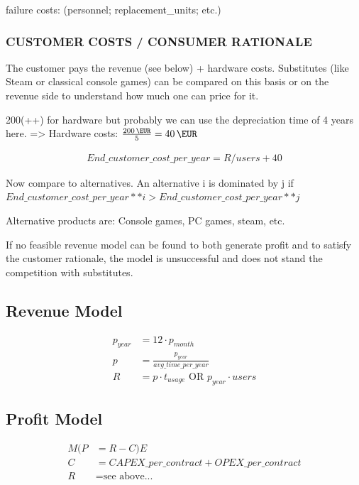 failure costs: (personnel; replacement\_units; etc.) 

\subsubsection{CUSTOMER COSTS / CONSUMER RATIONALE}

The customer pays the revenue (see below) + hardware costs. Substitutes (like Steam or classical console games) can be compared on this basis or on the revenue side to understand how much one can price for it.

200(++) for hardware but probably we can use the depreciation time of 4 years here. 
=> Hardware costs: $ \frac{\SI{200}{\EUR}}{5}  = \SI{40}{\EUR}$

\begin{align}
End\_customer\_cost\_per\_year = R/users + 40
\end{align}

Now compare to alternatives. An alternative i is dominated by j if $End\_customer\_cost\_per\_year ** i > End\_customer\_cost\_per\_year ** j$

Alternative products are: Console games, PC games, steam, etc.

If no feasible revenue model can be found to both generate profit and to satisfy the customer rationale, the model is unsuccessful and does not stand the competition with substitutes.



\subsection{Revenue Model}

\begin{align*}
p_{year} &= 12 \cdot p_{month} \\
p &= \frac{p_{year}}{avg\_time\_per\_year} \\
R &= p  \cdot t_{usage} \text{ OR } p_{year} \cdot users
\end{align*}


\subsection{Profit Model}

\begin{align*}
M(P & =R-C)E \\
C &= CAPEX\_per\_contract + OPEX\_per\_contract \\
R &= \text{see above...}
\end{align*}

